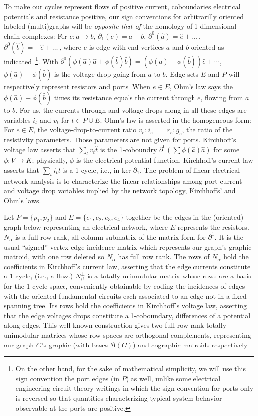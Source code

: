 

To make our cycles represent flows of positive current,
coboundaries electrical potentials and resistance positive,
our sign conventions for arbitrarilly oriented labeled (multi)graphs
will be \emph{opposite that of} the homology of 1-dimensional chain complexes:
For $e : a \rightarrow b$, $\partial_1(e)=a-b$, $\partial^0(\hat{a})=\hat{e}+ \ldots\  $,
$\partial^0(\hat{b})=-\hat{e}+ \ldots\  $, where $e$ is edge with end vertices $a$ and $b$ oriented
as indicated\
\footnote{
On the other hand, for the sake of mathematical simplicity,
we will use this sign convention the port edges (in $P$) as well, unlike some electrical engineering
circuit theory writings in which the sign convention for ports only is reversed
so that quantities characterizing typical system behavior observable at the ports
are positive.}.
With $\partial^0(\phi(\hat{a}) \hat{a} + \phi(\hat{b}) \hat{b}) = (\phi(\hat{a})-\phi(\hat{b}))\hat{e} + \cdots$,
$\phi(\hat{a})-\phi(\hat{b})$ is the voltage drop going from $a$ to $b$.
Edge sets $E$ and $P$ will respectively represent resistors and ports.
When $e\in E$,
Ohm's law says the
$\phi(\hat{a})-\phi(\hat{b})$ times its resistance equals the current through $e$, flowing from $a$ to $b$.
For us, the currents through and voltage drops along
in all these edges are variables $i_t$ and $v_t$ for $t\in P\cup E$.  Ohm's law
is asserted in the homogeneous form:  For $e\in E$, the voltage-drop-to-current ratio
$v_e:i_e$ $=$ $r_e:g_e$, the ratio of the resistivity parameters.
Those parameters are not given for ports.
Kirchhoff's voltage law asserts that $\sum_tv_t\hat{t}$ is the 1-coboundry $\partial^0(\sum \phi(\hat{a})\hat{a})$
for some $\phi:V\rightarrow K$; physically, $\phi$ is the electrical potential function.
Kirchhoff's current law asserts that $\sum_ti_t t$ is a 1-cycle, i.e., in $\text{ker }\partial_1$. 
The problem of linear electrical network analysis is to characterize
the linear relationships among port current and voltage drop variables implied by
the network topology, Kirchhoffs' and Ohm's laws.  


Let $P=\{p_1, p_2\}$ and $E=\{e_1, e_2, e_3, e_4\}$ together be the edges in the (oriented) graph
below representing an electrical network, where $E$ represents the resistors.   $N_\alpha$ is
a full-row-rank, all-column submatrix of the matrix form for $\partial^1$.  It is the
usual ``signed'' vertex-edge incidence matrix which represents our graph's graphic matroid, with one
row deleted so $N_\alpha$ has full row rank.  The rows of $N_\alpha$ hold the coefficients in
Kirchhoff's current law, asserting that the edge currents constitute a 1-cycle, (i.e., a flow.)
$N_\beta^\perp$ is a totally unimodular matrix whose
rows are a basis for the 1-cycle space, conveniently
obtainable by coding the incidences of edges with the oriented fundamental
circuits each associated to an edge not in a fixed spanning tree.
Its rows hold the coefficients in
Kirchhoff's voltage law, asserting that the edge
voltages drops constitute a 1-coboundary, differences
of a potential along edges.
This well-known construction gives
two full row rank totally unimodular matrices whose row spaces are orthogonal complements,
representing our graph $G$'s
graphic (with bases $\mathcal{B}(G)$) and cographic matroids respectively.

